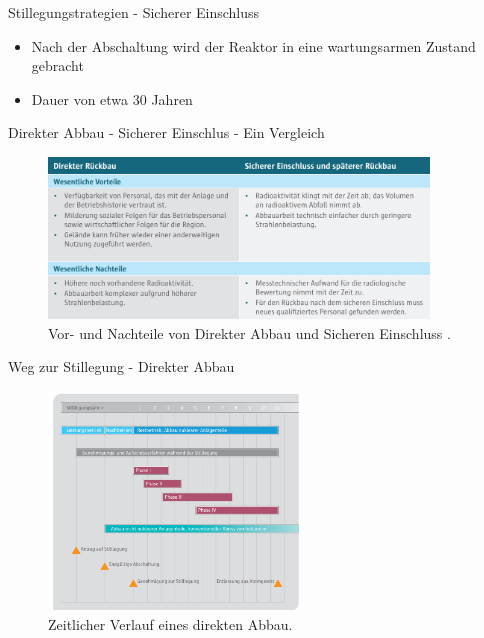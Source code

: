 \begin{frame}{Stillegungstrategien - Sicherer Einschluss}
  \begin{itemize}
    \setlength\itemsep{1.2em}
    \item{ Nach der Abschaltung wird der Reaktor in eine wartungsarmen Zustand gebracht}
    \item{ Dauer von etwa $30$ Jahren}
  \end{itemize}
\end{frame}



\begin{frame}{ Direkter Abbau - Sicherer Einschlus - Ein Vergleich}
  \begin{figure}
     \centering
     \includegraphics[width=0.9\textwidth]{./bilder/vor_nachteile_direkter_einschluss.PNG}
     \caption{ Vor- und Nachteile von Direkter Abbau und Sicheren Einschluss \cite{stilllegung_grs}. }
     \label{ fig: karte_abschaltungen }
   \end{figure}
\end{frame}



\begin{frame}{ Weg zur Stillegung - Direkter Abbau }
  \begin{figure}
     \centering
     \includegraphics[width=0.6\textwidth]{./bilder/stillegungs_zeit_2_kernfragen.PNG}
     \caption{ Zeitlicher Verlauf eines direkten Abbau\cite{stilllegung_grs}. }
     \label{ fig: stillegung }
   \end{figure}
\end{frame}



